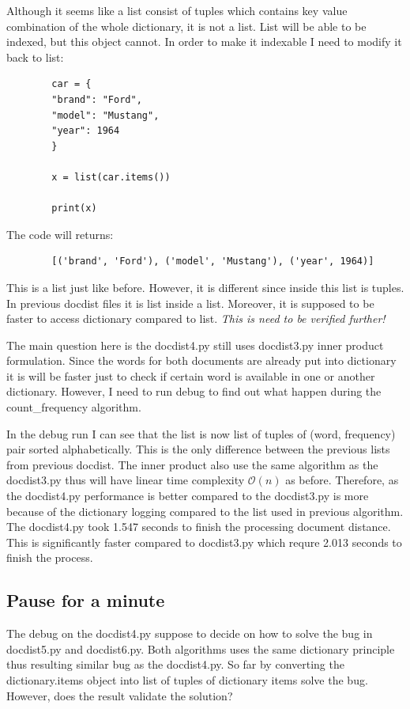 \documentclass{article}
\begin{document}
    Although it seems like a list consist of tuples which contains key value combination of the whole dictionary, it is not a list.
    List will be able to be indexed, but this object cannot.
    In order to make it indexable I need to modify it back to list:
    \begin{lstlisting}
        car = {
        "brand": "Ford",
        "model": "Mustang",
        "year": 1964
        }

        x = list(car.items())

        print(x)
    \end{lstlisting}
    The code will returns:
    \begin{lstlisting}
        [('brand', 'Ford'), ('model', 'Mustang'), ('year', 1964)]
    \end{lstlisting}
    This is a list just like before.
    However, it is different since inside this list is tuples.
    In previous docdist files it is list inside a list.
    Moreover, it is supposed to be faster to access dictionary compared to list. \textit{This is need to be verified further!}

    The main question here is the docdist4.py still uses docdist3.py inner product formulation.
    Since the words for both documents are already put into dictionary it is will be faster just to check if certain word is available in one or another dictionary.
    However, I need to run debug to find out what happen during the count\_frequency algorithm.

    In the debug run I can see that the list is now list of tuples of (word, frequency) pair sorted alphabetically.
    This is the only difference between the previous lists from previous docdist.
    The inner product also use the same algorithm as the docdist3.py thus will have linear time complexity $\mathcal{O}(n)$ as before.
    Therefore, as the docdist4.py performance is better compared to the docdist3.py is more because of the dictionary logging compared to the list used in previous algorithm.
    The docdist4.py took 1.547 seconds to finish the processing document distance.
    This is significantly faster compared to docdist3.py which requre 2.013 seconds to finish the process.

    \subsection*{Pause for a minute}
    The debug on the docdist4.py suppose to decide on how to solve the bug in docdist5.py and docdist6.py.
    Both algorithms uses the same dictionary principle thus resulting similar bug as the docdist4.py.
    So far by converting the dictionary.items object into list of tuples of dictionary items solve the bug.
    However, does the result validate the solution?
\end{document}
